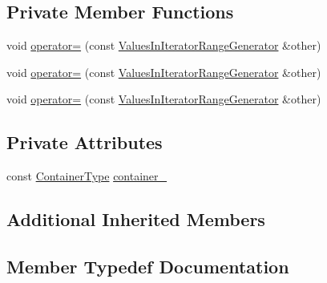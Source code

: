 \subsection*{Private Member Functions}
\begin{DoxyCompactItemize}
\item 
void \mbox{\hyperlink{classtesting_1_1internal_1_1_values_in_iterator_range_generator_ab43e1feff118f5be232ae1b85d539dd1}{operator=}} (const \mbox{\hyperlink{classtesting_1_1internal_1_1_values_in_iterator_range_generator}{Values\+In\+Iterator\+Range\+Generator}} \&other)
\item 
void \mbox{\hyperlink{classtesting_1_1internal_1_1_values_in_iterator_range_generator_ab43e1feff118f5be232ae1b85d539dd1}{operator=}} (const \mbox{\hyperlink{classtesting_1_1internal_1_1_values_in_iterator_range_generator}{Values\+In\+Iterator\+Range\+Generator}} \&other)
\item 
void \mbox{\hyperlink{classtesting_1_1internal_1_1_values_in_iterator_range_generator_ab43e1feff118f5be232ae1b85d539dd1}{operator=}} (const \mbox{\hyperlink{classtesting_1_1internal_1_1_values_in_iterator_range_generator}{Values\+In\+Iterator\+Range\+Generator}} \&other)
\end{DoxyCompactItemize}
\subsection*{Private Attributes}
\begin{DoxyCompactItemize}
\item 
const \mbox{\hyperlink{classtesting_1_1internal_1_1_values_in_iterator_range_generator_afab6b799a125b471a8784ced9cf7335c}{Container\+Type}} \mbox{\hyperlink{classtesting_1_1internal_1_1_values_in_iterator_range_generator_ad2701e9149384e64b1b98da5d31eb7a4}{container\+\_\+}}
\end{DoxyCompactItemize}
\subsection*{Additional Inherited Members}


\subsection{Member Typedef Documentation}
\mbox{\label{classtesting_1_1internal_1_1_values_in_iterator_range_generator_afab6b799a125b471a8784ced9cf7335c}} 
